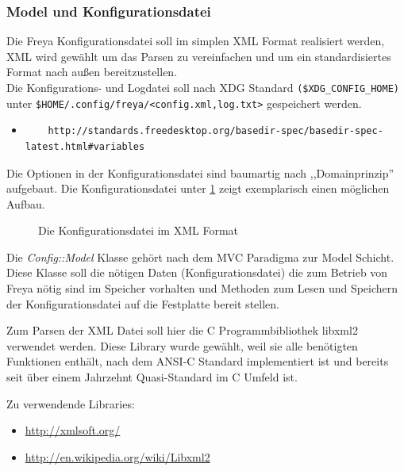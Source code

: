 
\subsubsection{Model und Konfigurationsdatei}

Die Freya Konfigurationsdatei soll im simplen XML Format realisiert werden, XML wird gewählt um das Parsen zu vereinfachen und um
ein standardisiertes Format nach außen bereitzustellen. 
\\
Die Konfigurations- und Logdatei soll nach XDG Standard \verb+($XDG_CONFIG_HOME)+ unter \verb+$HOME/.config/freya/<config.xml,log.txt>+ gespeichert werden.
\begin{itemize}
\item \begin{verbatim}
	http://standards.freedesktop.org/basedir-spec/basedir-spec-latest.html#variables
\end{verbatim}
\end{itemize}

Die Optionen in der Konfigurationsdatei sind baumartig nach ,,Domainprinzip'' aufgebaut. Die Konfigurationsdatei unter \ref{c_config}
zeigt exemplarisch einen möglichen Aufbau.


\begin{figure}[h!]

\caption{Die Konfigurationsdatei im XML Format}
\label{c_config}
\end{figure}

Die \emph{Config::Model} Klasse gehört nach dem MVC Paradigma zur Model Schicht. Diese Klasse soll die nötigen Daten (Konfigurationsdatei)
die zum Betrieb von Freya nötig sind im Speicher vorhalten und Methoden zum Lesen und Speichern der Konfigurationsdatei auf die Festplatte 
bereit stellen.

Zum Parsen der XML Datei soll hier die C Programmbibliothek libxml2 verwendet werden. Diese Library wurde gewählt, weil sie alle benötigten Funktionen enthält, nach dem ANSI-C Standard implementiert ist
und bereits seit über einem Jahrzehnt Quasi-Standard im C Umfeld ist.

Zu verwendende Libraries:
\begin{itemize}
    \item \url{http://xmlsoft.org/}
    \item \url{http://en.wikipedia.org/wiki/Libxml2}
\end{itemize}

